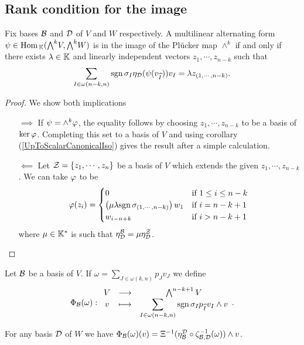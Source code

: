 \subsection{Rank condition for the image}
\begin{lemma}\label{DecomposabilityOfMultilinearForm}
Fix bases $\mathcal{B}$ and $\mathcal{D}$ of $V$ and $W$ respectively. 
A multilinear alternating form $\psi\in \Hom_\K(\bw V,\bw W)$ is in the image of the Pl\"ucker map $\wedge^k$ if and only if there exists $\lambda\in\mathbb{K}$ and linearly independent vectors $z_1,\cdots,z_{n-k}$ such that
\[\sum_{I\in \omega(n-k,n)}\mathrm{sgn}\,\sigma_I\eta_{\mathcal{D}}(\psi(v_{\widehat{I}}))v_I=\lambda z_{(1,\cdots, n-k)}.\]
\end{lemma}
\begin{proof}
We show both implications
\setlength{\leftmargini}{1.2cm}
\begin{itemize}
\item[$\boxed{\implies}$] If $\psi=\wedge^k\varphi$, the equality follows by choosing $z_1,\cdots, z_{n-k}$ to be a basis of $\ker\varphi$. Completing this set to a basis of $V$ and using corollary (\ref{UpToScalarCanonicalIso}) gives the result after a simple calculation.
\item[$\boxed{\impliedby}$] Let $\mathcal{Z}=\left\{{z_1,\cdots, z_n}\right\}$ be a basis of $V$ which extends the given $z_1,\cdots, z_{n-k}$. We can take $\varphi$ to be
\[\varphi(z_i)=\begin{cases}
0 & \text{if }1\leq i\leq n-k\\
\left({\mu\lambda\mathrm{sgn}\,\sigma_{(1,\cdots,n-k)}}\right) w_1 & \text{if }i=n-k+1\\
w_{i-n+k} & \text{if }i>n-k+1
\end{cases}\]
where $\mu\in\mathbb{K}^\ast$ is such that $\eta^{\mathcal{B}}_{\mathcal{D}}=\mu \eta^{\mathcal{Z}}_{\mathcal{D}}$.
\end{itemize}
\setlength{\leftmargini}{0.5cm}
\end{proof}

\begin{definition}
Let $\mathcal{B}$ be a basis of $V$. If $\omega=\sum_{J\in\omega(k,n)}p_J v_J$ we define
\[\Phi_{\mathcal{B}}(\omega):\begin{array}{ccc} {V} & \longrightarrow & {\bigwedge^{n-k+1}V}\\ {v} & \longmapsto & {\displaystyle\sum_{I\in \omega(n-k,n)}\mathrm{sgn}\,\sigma_I p_{\widehat{I}}v_I\wedge v} \end{array}.\]
\end{definition}

\begin{remark}
For any basis $\mathcal{D}$ of $W$ we have $\Phi_{\mathcal{B}}(\omega)(v)=\Xi^{-1}(\eta^{\mathcal{D}}_{\mathcal{B}}\circ \zeta_{\mathcal{B},\mathcal{D}}^{-1}(\omega))\wedge v$.
\end{remark}

